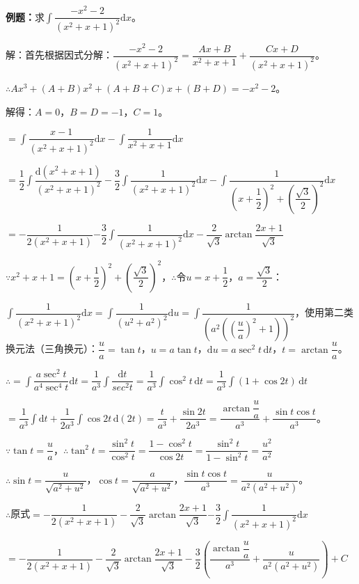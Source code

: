 \documentclass[UTF8, 12pt]{ctexart}
\begin{document}
\textbf{例题：}求$\displaystyle{\int\dfrac{-x^2-2}{(x^2+x+1)^2}\textrm{d}x}$。

解：首先根据因式分解：$\dfrac{-x^2-2}{(x^2+x+1)^2}=\dfrac{Ax+B}{x^2+x+1}+\dfrac{Cx+D}{(x^2+x+1)^2}$。

$\therefore Ax^3+(A+B)x^2+(A+B+C)x+(B+D)=-x^2-2$。

解得：$A=0$，$B=D=-1$，$C=1$。

$=\displaystyle{\int\dfrac{x-1}{(x^2+x+1)^2}\textrm{d}x-\int\dfrac{1}{x^2+x+1}\textrm{d}x}$

$=\displaystyle{\dfrac{1}{2}\int\dfrac{\textrm{d}(x^2+x+1)}{(x^2+x+1)^2}-\dfrac{3}{2}\int\dfrac{1}{(x^2+x+1)^2}\textrm{d}x-\int\dfrac{1}{\left(x+\dfrac{1}{2}\right)^2+\left(\dfrac{\sqrt{3}}{2}\right)^2}\textrm{d}x}$

$=-\dfrac{1}{2(x^2+x+1)}\displaystyle{-\dfrac{3}{2}\int\dfrac{1}{(x^2+x+1)^2}\textrm{d}x}-\dfrac{2}{\sqrt{3}}\arctan\dfrac{2x+1}{\sqrt{3}}$ \smallskip

$\because x^2+x+1=\left(x+\dfrac{1}{2}\right)^2+\left(\dfrac{\sqrt{3}}{2}\right)^2$，$\therefore$令$u=x+\dfrac{1}{2}$，$a=\dfrac{\sqrt{3}}{2}$：

$\displaystyle{\int\dfrac{1}{(x^2+x+1)^2}\textrm{d}x=\int\dfrac{1}{(u^2+a^2)^2}\textrm{d}u=\int\dfrac{1}{\left(a^2\left(\left(\dfrac{u}{a}\right)^2+1\right)\right)^2}}$，使用第二类换元法（三角换元）：$\dfrac{u}{a}=\tan t$，$u=a\tan t$，$\textrm{d}u=a\sec^2t\,\textrm{d}t$，$t=\arctan\dfrac{u}{a}$。

$\therefore=\displaystyle{\int\dfrac{a\sec^2t}{a^4\sec^4t}\textrm{d}t=\dfrac{1}{a^3}\int\dfrac{\textrm{d}t}{sec^2t}}=\dfrac{1}{a^3}\int\cos^2t\,\textrm{d}t=\dfrac{1}{a^3}\int(1+\cos2t)\,\textrm{d}t$

$=\dfrac{1}{a^3}\int\textrm{d}t+\dfrac{1}{2a^3}\int\cos2t\,\textrm{d}(2t)=\dfrac{t}{a^3}+\dfrac{\sin2t}{2a^3}=\dfrac{\arctan\dfrac{u}{a}}{a^3}+\dfrac{\sin t\cos t}{a^3}$。

$\because\tan t=\dfrac{u}{a}$，$\therefore\tan^2t=\dfrac{\sin^2t}{\cos^2t}=\dfrac{1-\cos^2t}{\cos2t}=\dfrac{\sin^2t}{1-\sin^2t}=\dfrac{u^2}{a^2}$

$\therefore\sin t=\dfrac{u}{\sqrt{a^2+u^2}}$，$\cos t=\dfrac{a}{\sqrt{a^2+u^2}}$，$\dfrac{\sin t\cos t}{a^3}=\dfrac{u}{a^2(a^2+u^2)}$。

$\therefore$原式$=-\dfrac{1}{2(x^2+x+1)}-\dfrac{2}{\sqrt{3}}\arctan\dfrac{2x+1}{\sqrt{3}}\displaystyle{-\dfrac{3}{2}\int\dfrac{1}{(x^2+x+1)^2}\textrm{d}x}$

$=-\dfrac{1}{2(x^2+x+1)}-\dfrac{2}{\sqrt{3}}\arctan\dfrac{2x+1}{\sqrt{3}}-\dfrac{3}{2}\left(\dfrac{\arctan\dfrac{u}{a}}{a^3}+\dfrac{u}{a^2(a^2+u^2)}\right)+C$
\end{document}
